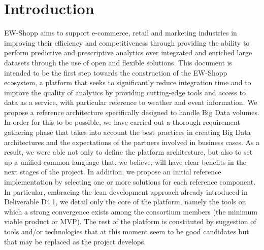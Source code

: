 \section{Introduction}

EW-Shopp aims to support e-commerce, retail and marketing industries in improving their efficiency and competitiveness through providing the ability to perform predictive and prescriptive analytics over integrated and enriched large datasets through the use of open and flexible solutions. 
This document is intended to be the first step towards the construction of the EW-Shopp ecosystem, a platform that seeks to significantly reduce integration time and to improve the quality of analytics by providing cutting-edge tools and access to data as a service, with particular reference to weather and event information.  
We propose a reference architecture specifically designed to handle Big Data volumes. In order for this to be possible, we have carried out a thorough requirement gathering phase that takes into account the best practices in creating Big Data architectures and the expectations of the partners involved in business cases. As a result, we were able not only to define the platform architecture, but also to set up a unified common language that, we believe, will have clear benefits in the next stages of the project.
In addition, we propose an initial reference implementation by selecting one or more solutions for each reference component. In particular, embracing the lean development approach already introduced in Deliverable D4.1, we detail only the core of the platform, namely the tools on which a strong convergence exists among the consortium members (the minimum viable product or MVP). The rest of the platform is constituted by suggestion of tools and/or technologies that at this moment seem to be good candidates but that may be replaced as the project develops. 

